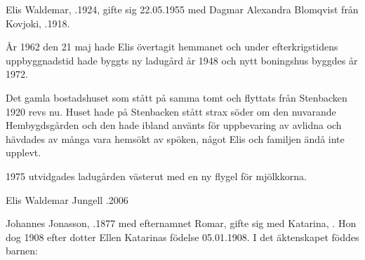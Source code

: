 %
Elis Waldemar, .1924, gifte sig 22.05.1955 med Dagmar Alexandra Blomqvist från Kovjoki, .1918.

År 1962 den 21 maj hade Elis övertagit hemmanet och under efterkrigstidens uppbyggnadstid hade byggts ny ladugård år 1948 och nytt boningshus byggdes år 1972.

Det gamla bostadshuset som stått på samma tomt och flyttats från Stenbacken 1920 revs nu. Huset hade på Stenbacken stått strax söder om den nuvarande Hembygdsgården och den hade ibland använts för uppbevaring av avlidna och hävdades av många vara hemsökt av spöken, något Elis och familjen ändå inte upplevt.

1975 utvidgades ladugården västerut med en ny flygel för mjölkkorna.

\begin{jhchildren}
  \item {}
  \item {}
\end{jhchildren}

Elis Waldemar Jungell .2006



%



%
Johannes Jonasson, .1877 med efternamnet Romar, gifte sig med Katarina, . Hon dog 1908 efter dotter Ellen Katarinas födelse 05.01.1908. I det äktenskapet föddes barnen:

\begin{jhchildren}
  \item {}
  \item {}
  \item {}
\end{jhchildren}

